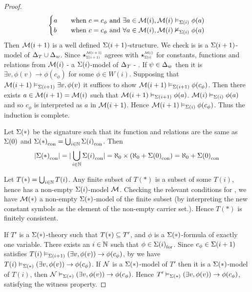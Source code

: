 \begin{proof}
\[\begin{cases}
            a \quad &\text{when } c = c_\phi \text{ and } 
            \exists a \in {\mathcal{M}(i)}, \mathcal{M}(i) \vDash_{\Sigma(i)} \phi(a)\\
            b \quad &\text{when } c = c_\phi \text{ and } 
            \forall a \in {\mathcal{M}(i)}, \mathcal{M}(i) \nvDash_{\Sigma(i)} \phi(a)
        \end{cases}
        \]
    Then $\mathcal{M}(i+1)$ is a well defined $\Sigma(i+1)$-structure.
    We check is is a $\Sigma(i+1)$-model of $\Delta_T \cup \Delta_w$.
    Since 
    $\intp{\Si(i+1)}{\MM(i+1)}$ agrees with 
    $\intp{\Si(i)}{\MM(i)}$ for constants, 
    functions and relations from $\mathcal{M}(i)$ - a $\Sigma(i)$-model
    of $\Delta_T$ -
    .
    If $\psi \in \Delta_w$ then it is 
    $\exists v, \phi(v) \to \phi(c_\phi)$ for some 
    $\phi \in W(i)$.
    Supposing that $\mathcal{M}(i+1) \vDash_{\Sigma(i+1)} \exists v, \phi(v)$
    it suffices to show $\mathcal{M}(i+1) \vDash_{\Sigma(i+1)} \phi(c_\phi)$.
    Then there exists $a \in \mathcal{M}(i + 1) = \mathcal{M}(i)$ such that 
    $\mathcal{M}(i+1) \vDash_{\Sigma(i+1)} \phi(a)$.
     $\mathcal{M}(i) \vDash_{\Sigma(i)} \phi(a)$
    and so $c_\phi$ is interpreted as $a$ in $\mathcal{M}(i+1)$.
    Hence $\mathcal{M}(i + 1) \vDash_{\Sigma(i)} \phi(c_\phi)$.
    Thus the induction is complete.

    Let $\Sigma(*)$ 
    be the signature such that its function and relations 
    are the same as $\Sigma(0)$
    and ${\Sigma(*)}_\mathrm{con} = \bigcup_{i \in \mathbb{N}} {\Sigma(i)}_\mathrm{con}$.
    Then 
    \[
        |{\Sigma(*)}_\mathrm{con}| = |\bigcup_{i \in \mathbb{N}} {\Sigma(i)}_\mathrm{con}| = 
        \aleph_0 \times (\aleph_0 + {\Sigma(0)}_\mathrm{con}) = 
        \aleph_0 + {\Sigma(0)}_\mathrm{con}
    \]

    Let $T(*) = \bigcup_{i \in \mathbb{N}} T(i)$.
    Any finite subset of $T(*)$ is a subset of some
    $T(i)$, 
    hence has a non-empty $\Sigma(i)$-model $\mathcal{M}$.
    Checking the relevant conditions for
    ,
    we have
    $\mathcal{M}(*)$ a non-empty $\Sigma(*)$-model of the finite subset
    (by interpreting the new constant symbols as the 
    element of the non-empty carrier set.).
    Hence $T(*)$ is finitely consistent.
    
    If $T'$ is a $\Sigma(*)$-theory such that $T(*) \subseteq T'$,
    and $\phi$ is a $\Sigma(*)$-formula of exactly one variable.
    There exists an $i \in \mathbb{N}$ such that $\phi \in {\Sigma(i)}_\mathrm{for}$.
    Since $c_\phi \in \Sigma(i+1)$ satisfies 
    $T(i) \vDash_{\Sigma(i+1)} \left(\exists v, \phi(v)\right) \to \phi(c_\phi)$,
    by 
    we have $T(i) \vDash_{\Sigma(*)} \left(\exists v, \phi(v)\right) \to \phi(c_\phi)$.
    If $\mathcal{N}$ is a $\Sigma(*)$-model of $T'$
    then it is a $\Sigma(*)$-model of $T(i)$,
    then $\mathcal{N} \vDash_{\Sigma(*)} \left(\exists v, \phi(v)\right) \to \phi(c_\phi)$.
    Hence $T' \vDash_{\Sigma(*)} \left(\exists v, \phi(v)\right) \to \phi(c_\phi)$,
    satisfying the witness property.
\end{proof}

